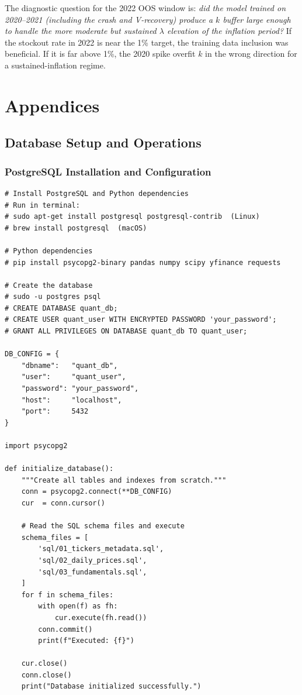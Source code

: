 \documentclass[11pt, oneside]{book}
\begin{document}
The diagnostic question for the 2022 OOS window is: \textit{did the model trained on 2020--2021 (including the crash and V-recovery) produce a $k$ buffer large enough to handle the more moderate but sustained $\lambda$ elevation of the inflation period?} If the stockout rate in 2022 is near the 1\% target, the training data inclusion was beneficial. If it is far above 1\%, the 2020 spike overfit $k$ in the wrong direction for a sustained-inflation regime.

\part{Appendices}

\chapter{Database Setup and Operations}

\section{PostgreSQL Installation and Configuration}

\begin{lstlisting}[style=pythonstyle, caption={Environment Setup Script}]
# Install PostgreSQL and Python dependencies
# Run in terminal:
# sudo apt-get install postgresql postgresql-contrib  (Linux)
# brew install postgresql  (macOS)

# Python dependencies
# pip install psycopg2-binary pandas numpy scipy yfinance requests

# Create the database
# sudo -u postgres psql
# CREATE DATABASE quant_db;
# CREATE USER quant_user WITH ENCRYPTED PASSWORD 'your_password';
# GRANT ALL PRIVILEGES ON DATABASE quant_db TO quant_user;

DB_CONFIG = {
    "dbname":   "quant_db",
    "user":     "quant_user",
    "password": "your_password",
    "host":     "localhost",
    "port":     5432
}

import psycopg2

def initialize_database():
    """Create all tables and indexes from scratch."""
    conn = psycopg2.connect(**DB_CONFIG)
    cur  = conn.cursor()

    # Read the SQL schema files and execute
    schema_files = [
        'sql/01_tickers_metadata.sql',
        'sql/02_daily_prices.sql',
        'sql/03_fundamentals.sql',
    ]
    for f in schema_files:
        with open(f) as fh:
            cur.execute(fh.read())
        conn.commit()
        print(f"Executed: {f}")

    cur.close()
    conn.close()
    print("Database initialized successfully.")
\end{lstlisting}
\end{document}
